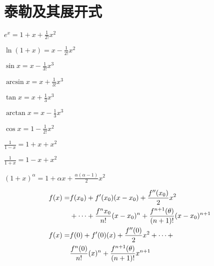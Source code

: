 \section{泰勒及其展开式}

\begin{multicols}{2}
    \begin{spacing}{\hangju}
        \noindent $e^x = 1 + x + \frac{1}{2!}x^2$

        \noindent $\ln{(1 + x)} = x - \frac{1}{2!}x^2$

        \noindent $\sin{x} = x - \frac{1}{3!}x^{3}$

        \noindent $\arcsin{x} = x + \frac{1}{3!}x^{3}$

        \noindent $\tan{x} = x + \frac{1}{3}x^3$

        \noindent $\arctan{x} = x - \frac{1}{3}x^3$

        \noindent $\cos{x} = 1 - \frac{1}{2!}x^2$

        \noindent $\frac{1}{1 - x} = 1 + x + x^2$

        \noindent $\frac{1}{1 + x} = 1 - x + x^2$

        \noindent $(1 + x)^\alpha = 1 + \alpha x + \frac{\alpha(\alpha - 1)}{2}x^2$
    \end{spacing}
\end{multicols}

\begin{equation*}%
    \begin{split}
        \setlength{\abovedisplayskip}{-3pt}
        f(x) = & f(x_0) + f'(x_0)(x-x_0) + \frac{f''(x_0)}{2} x^2 \\
               & + \cdots + \frac{f^{n}x_0}{n!} (x-x_0)^n + \frac{f^{n+1}(\theta)}{(n+1)!}(x - x_0)^{n+1}
        \\
        f(x) = & f(0) + f'(0)(x) + \frac{f''(0)}{2} x^2 + \cdots + \\
               & \frac{f^{n}(0)}{n!} (x)^n + \frac{f^{n+1}(\theta)}{(n+1)!}x^{n+1}
    \end{split}
\end{equation*}
